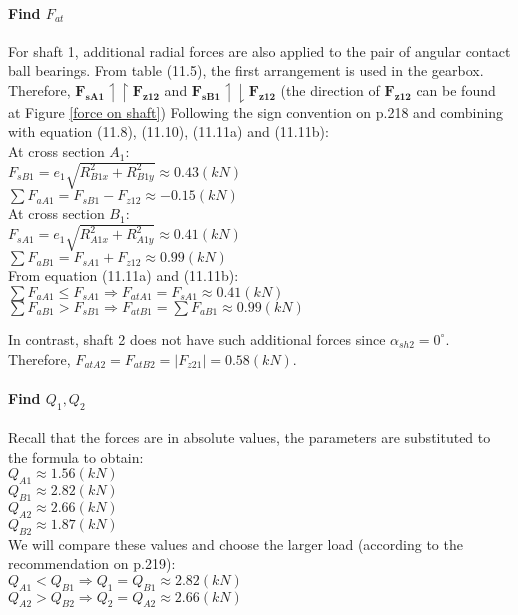 \paragraph{Find $ F_{at} $} For shaft 1, additional radial forces are also applied to the pair of angular contact ball bearings. From table (11.5), the first arrangement is used in the gearbox. Therefore, $ \mathbf{F_{sA1}} \upharpoonleft\upharpoonright \mathbf{F_{z12}} $ and $ \mathbf{F_{sB1}} \upharpoonleft\downharpoonright \mathbf{F_{z12}} $ (the direction of $ \mathbf{F_{z12}} $ can be found at Figure \ref{force on shaft}) Following the sign convention on p.218 and combining with equation (11.8), (11.10), (11.11a) and (11.11b):\\
At cross section $ A_1 $:\\
$ F_{sB1} = e_1\sqrt{R_{B1x}^2+R_{B1y}^2}  \approx 0.43\unit{(kN)}$\\
$ \displaystyle\sum F_{aA1} = F_{sB1} - F_{z12} \approx -0.15 \unit{(kN)}$\\
At cross section $ B_1 $:\\
$ F_{sA1} = e_1\sqrt{R_{A1x}^2+R_{A1y}^2}  \approx 0.41\unit{(kN)}$\\
$ \displaystyle\sum F_{aB1} = F_{sA1} + F_{z12} \approx 0.99 \unit{(kN)}$\\
From equation (11.11a) and (11.11b):\\
$  \displaystyle\sum F_{aA1} \leq F_{sA1} \Rightarrow F_{atA1} = F_{sA1}  \approx  0.41\unit{(kN)} $\\
$ \displaystyle \sum F_{aB1} > F_{sB1} \Rightarrow F_{atB1} = \sum F_{aB1}  \approx  0.99\unit{(kN)} $

In contrast, shaft 2 does not have such additional forces since $ \alpha_{sh2} = 0^\circ $. Therefore, $ F_{atA2} = F_{atB2} = |F_{z21}| = 0.58\unit{(kN)} $.

\paragraph{Find $ Q_1,Q_2 $}
Recall that the forces are in absolute values, the parameters are substituted to the formula to obtain:\\
$ Q_{A1} \approx 1.56 \unit{(kN)} $\\
$ Q_{B1} \approx 2.82 \unit{(kN)} $\\
$ Q_{A2} \approx2.66  \unit{(kN)} $\\
$ Q_{B2} \approx 1.87 \unit{(kN)} $\\
We will compare these values and choose the larger load (according to the recommendation on p.219):\\
$ Q_{A1} < Q_{B1} \Rightarrow Q_1 = Q_{B1}  \approx 2.82 \unit{(kN)}$\\
$ Q_{A2} > Q_{B2} \Rightarrow Q_2 = Q_{A2}  \approx 2.66 \unit{(kN)}$\\

